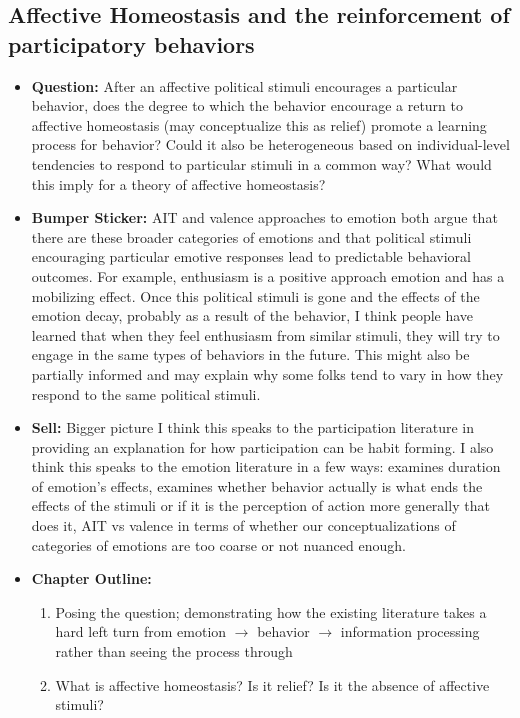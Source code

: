 \documentclass[12pt]{article}
\begin{document}
\subsection{Affective Homeostasis and the reinforcement of participatory behaviors}
    \begin{itemize}
        \item \textbf{Question:} After an affective political stimuli encourages a particular behavior, does the degree to which the behavior encourage a return to affective homeostasis (may conceptualize this as relief) promote a learning process for behavior? Could it also be heterogeneous based on individual-level tendencies to respond to particular stimuli in a common way? What would this imply for a theory of affective homeostasis?
        \item \textbf{Bumper Sticker:} AIT and valence approaches to emotion both argue that there are these broader categories of emotions and that political stimuli encouraging particular emotive responses lead to predictable behavioral outcomes. For example, enthusiasm is a positive approach emotion and has a mobilizing effect. Once this political stimuli is gone and the effects of the emotion decay, probably as a result of the behavior, I think people have learned that when they feel enthusiasm from similar stimuli, they will try to engage in the same types of behaviors in the future. This might also be partially informed and may explain why some folks tend to vary in how they respond to the same political stimuli.
        \item \textbf{Sell:} Bigger picture I think this speaks to the participation literature in providing an explanation for how participation can be habit forming. I also think this speaks to the emotion literature in a few ways: examines duration of emotion's effects, examines whether behavior actually is what ends the effects of the stimuli or if it is the perception of action more generally that does it, AIT vs valence in terms of whether our conceptualizations of categories of emotions are too coarse or not nuanced enough. 
        \item \textbf{Chapter Outline:}
        \begin{enumerate}
            \item Posing the question; demonstrating how the existing literature takes a hard left turn from emotion $\rightarrow$ behavior $\rightarrow$ information processing rather than seeing the process through
            \item What is affective homeostasis? Is it relief? Is it the absence of affective stimuli?

\end{enumerate}
\end{itemize}
\end{document}
